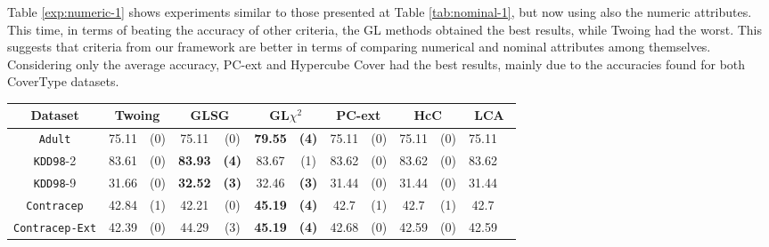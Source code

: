 Table \ref{exp:numeric-1} shows experiments  similar to those presented at Table \ref{tab:nominal-1}, but now
using also the numeric attributes. This time, in terms of beating the accuracy of other criteria, the GL methods obtained the best results, while Twoing had the worst. This suggests that criteria from our framework are better in terms of comparing numerical and nominal attributes among themselves. Considering only the average accuracy, PC-ext and Hypercube Cover had the best results, mainly due to the accuracies found for both CoverType datasets.

\begin{table}
\small
\centering
\begin{tabular}{c|cc|cc|cc|cc|cc|cc} 
Dataset            &\multicolumn{2}{c|}{Twoing} & \multicolumn{2}{c|}{GLSG} & \multicolumn{2}{c|}{GL$\chi^2$} & \multicolumn{2}{c|}{PC-ext}& \multicolumn{2}{c|}{HcC}& \multicolumn{2}{c}{LCA}\\
\hline   
{\tt Adult}        & 75.11          &  (0)      & 75.11      & (0)          & {\bf 79.55} &  {\bf (4)}        & 75.11       &  (0)         & 75.11       &  (0)     & 75.11       &           \\
{\tt KDD98}-2      & 83.61          &  (0)      & {\bf 83.93}& {\bf (4)}    & 83.67       &  (1)              & 83.62       &  (0)         & 83.62       &  (0)     & 83.62       &           \\ 
{\tt KDD98}-9      & 31.66          &  (0)      &{\bf 32.52} & {\bf (3)}    & 32.46       &  {\bf (3)}        & 31.44       &  (0)         & 31.44       &  (0)     & 31.44       &           \\ 
{\tt Contracep}    & 42.84          &  (1)      & 42.21      & (0)          & {\bf 45.19} &  {\bf (4)}        & 42.7        &  (1)         & 42.7        &  (1)     & 42.7        &           \\  
{\tt Contracep-Ext}& 42.39          &  (0)      & 44.29      & (3)          & {\bf 45.19} &  {\bf (4)}        & 42.68       &  (0)         & 42.59       &  (0)     & 42.59       &           \\ 

\end{tabular}
\end{table}
